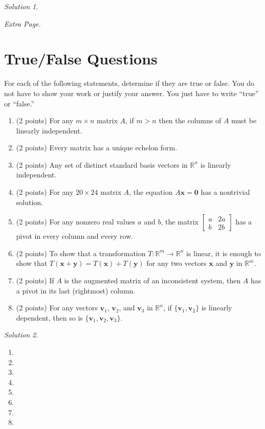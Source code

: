 \documentclass{article}
\theoremstyle{remark}
\newtheorem*{solution}{Solution}
\newcommand{\vv}[1]{\mathbf{#1}}
\newcommand{\R}{\mathbb R}
\begin{document}
\begin{solution}
\end{solution}

\pagebreak
\noindent\textit{Extra Page.}

\pagebreak
\section{True/False Questions}

For each of the following statements, determine if they are true or false.
You do not have to show your work or justify your answer. You just have to write ``true'' or ``false.''

\begin{enumerate}
\item (2 points) For any $m \times n$ matrix $A$, if $m > n$ then the columns of $A$ must be linearly independent.
\item (2 points) Every matrix has a unique echelon form.
\item (2 points) Any set of distinct standard basis vectors in $\mathbb R^n$ is linearly independent.
\item (2 points) For any $20 \times 24$ matrix $A$, the equation $A\vv x = \vv 0$ has a nontrivial solution.
\item (2 points) For any nonzero real values $a$ and $b$, the matrix
  $
  \begin{bmatrix}
    a & 2a \\
    b & 2b
  \end{bmatrix}
  $
  has a pivot in every column and every row.
\item (2 points) To show that a transformation $T: \R^m \to \R^n$ is linear, it is enough to show that $T(\vv x + \vv y) = T(\vv x) + T(\vv y)$ for any two vectors $\vv x$ and $\vv y$ in $\R^m$.
\item (2 points) If $A$ is the augmented matrix of an inconsistent system, then $A$ has a pivot in its last (rightmost) column.
\item (2 points) For any vectors $\vv v_1$, $\vv v_2$, and $\vv v_3$ in $\R^n$, if $\{\vv v_1, \vv v_2\}$ is linearly dependent, then so is $\{\vv v_1, \vv v_2, \vv v_3\}$.
\end{enumerate}

\begin{solution}
  \hfill
  \begin{enumerate}
  \item
  \item
  \item
  \item
  \item
  \item
  \item
  \item
  \end{enumerate}
\end{solution}
\end{document}
